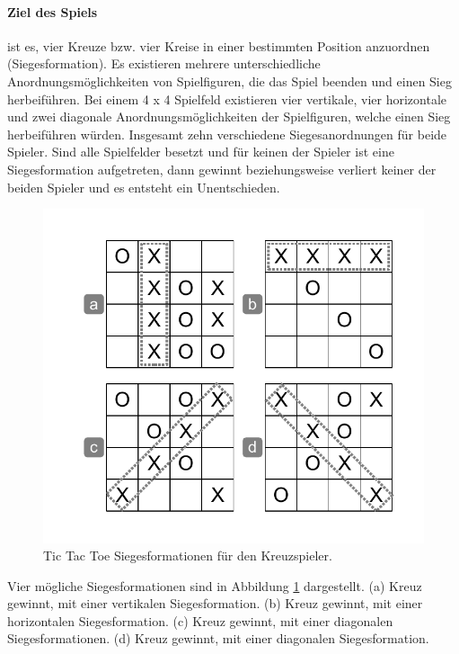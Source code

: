 \paragraph{Ziel des Spiels} ist es, vier Kreuze bzw. vier Kreise in einer bestimmten Position anzuordnen (Siegesformation). Es existieren mehrere unterschiedliche Anordnungsmöglichkeiten von Spielfiguren, die das Spiel beenden und einen Sieg herbeiführen. Bei einem 4 x 4 Spielfeld existieren vier vertikale, vier horizontale und zwei diagonale Anordnungsmöglichkeiten der Spielfiguren, welche einen Sieg herbeiführen würden. Insgesamt zehn verschiedene Siegesanordnungen für beide Spieler. Sind alle Spielfelder besetzt und für keinen der Spieler ist eine Siegesformation aufgetreten, dann gewinnt beziehungsweise verliert keiner der beiden Spieler und es entsteht ein Unentschieden. \\

\begin{figure}[!htbp]
  \centering
  \includegraphics[scale = 0.6]{inhalt/abbildungen/siegesbedingungen_tictactoe.pdf}
  \caption{Tic Tac Toe Siegesformationen für den Kreuzspieler.}
  \label{fig:siegesbedingungen_tictactoe}
\end{figure}

Vier mögliche Siegesformationen sind in Abbildung \ref{fig:siegesbedingungen_tictactoe} dargestellt. (a) Kreuz gewinnt, mit einer vertikalen Siegesformation. (b) Kreuz gewinnt, mit einer horizontalen Siegesformation. (c) Kreuz gewinnt, mit einer diagonalen Siegesformationen. (d) Kreuz gewinnt, mit einer diagonalen Siegesformation.

